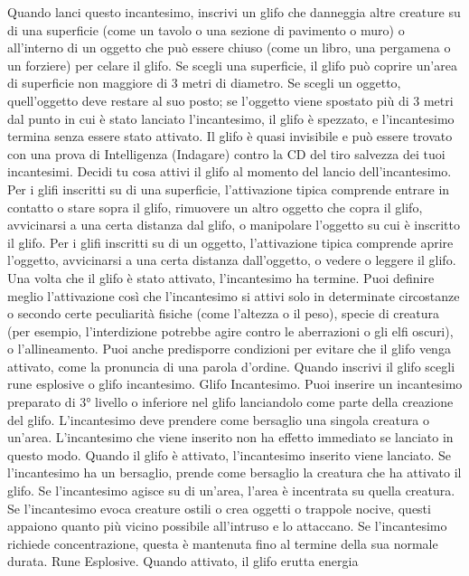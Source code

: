 \begin{multicols}{2}
Quando lanci questo incantesimo, inscrivi un glifo che
danneggia altre creature su di una superficie (come un
tavolo o una sezione di pavimento o muro) o all’interno
di un oggetto che può essere chiuso (come un libro,
una pergamena o un forziere) per celare il glifo. Se
scegli una superficie, il glifo può coprire un’area di
superficie non maggiore di 3 metri di diametro. Se
scegli un oggetto, quell’oggetto deve restare al suo
posto; se l’oggetto viene spostato più di 3 metri dal
punto in cui è stato lanciato l’incantesimo, il glifo è
spezzato, e l’incantesimo termina senza essere stato
attivato.
Il glifo è quasi invisibile e può essere trovato con una
prova di Intelligenza (Indagare) contro la CD del tiro
salvezza dei tuoi incantesimi.
Decidi tu cosa attivi il glifo al momento del lancio
dell’incantesimo.
Per i glifi inscritti su di una superficie, l’attivazione tipica
comprende entrare in contatto o stare sopra il glifo,
rimuovere un altro oggetto che copra il glifo, avvicinarsi
a una certa distanza dal glifo, o manipolare l’oggetto su
cui è inscritto il glifo.
Per i glifi inscritti su di un oggetto, l’attivazione tipica
comprende aprire l’oggetto, avvicinarsi a una certa
distanza dall’oggetto, o vedere o leggere il glifo. Una
volta che il glifo è stato attivato, l’incantesimo ha
termine.
Puoi definire meglio l’attivazione così che l’incantesimo
si attivi solo in determinate circostanze o secondo certe
peculiarità fisiche (come l’altezza o il peso), specie di
creatura (per esempio, l’interdizione potrebbe agire
contro le aberrazioni o gli elfi oscuri), o l’allineamento.
Puoi anche predisporre condizioni per evitare che il glifo
venga attivato, come la pronuncia di una parola
d’ordine.
Quando inscrivi il glifo scegli rune esplosive o glifo
incantesimo.
Glifo Incantesimo. Puoi inserire un incantesimo
preparato di 3° livello o inferiore nel glifo lanciandolo
come parte della creazione del glifo. L’incantesimo
deve prendere come bersaglio una singola creatura o
un’area. L’incantesimo che viene inserito non ha effetto
immediato se lanciato in questo modo. Quando il glifo è
attivato, l’incantesimo inserito viene lanciato. Se
l’incantesimo ha un bersaglio, prende come bersaglio la
creatura che ha attivato il glifo. Se l’incantesimo agisce
su di un’area, l’area è incentrata su quella creatura. Se
l’incantesimo evoca creature ostili o crea oggetti o
trappole nocive, questi appaiono quanto più vicino
possibile all’intruso e lo attaccano. Se l’incantesimo
richiede concentrazione, questa è mantenuta fino al
termine della sua normale durata.
Rune Esplosive. Quando attivato, il glifo erutta energia

\end{multicols}
